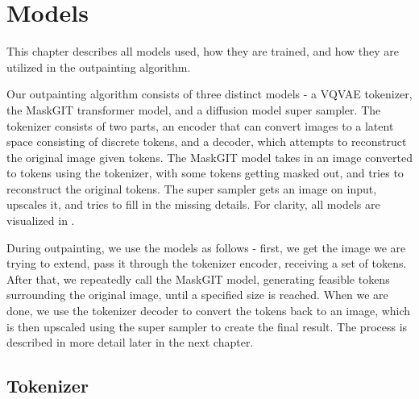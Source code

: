 \chapter{Models} \label{models}


This chapter describes all models used, how they are trained, and how they are utilized in the outpainting algorithm.

Our outpainting algorithm consists of three distinct models - a VQVAE tokenizer, the MaskGIT transformer model, and a diffusion model super sampler. The tokenizer consists of two parts, an encoder that can convert images to a latent space consisting of discrete tokens, and a decoder, which attempts to reconstruct the original image given tokens. The MaskGIT model takes in an image converted to tokens using the tokenizer, with some tokens getting masked out, and tries to reconstruct the original tokens. The super sampler gets an image on input, upscales it, and tries to fill in the missing details. For clarity, all models are visualized in .




During outpainting, we use the models as follows - first, we get the image we are trying to extend, pass it through the tokenizer encoder, receiving a set of tokens. After that, we repeatedly call the MaskGIT model, generating feasible tokens surrounding the original image, until a specified size is reached. When we are done, we use the tokenizer decoder to convert the tokens back to an image, which is then upscaled using the super sampler to create the final result. The process is described in more detail later in the next chapter.


\section{Tokenizer}

